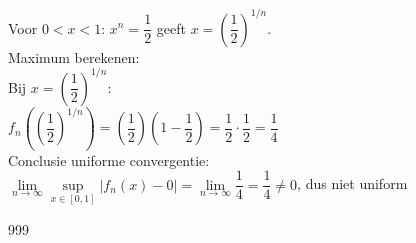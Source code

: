 \documentclass[a4paper]{article}
\begin{document}
Voor $0 < x < 1$: $x^n = \dfrac{1}{2}$ geeft $x = \left(\dfrac{1}{2}\right)^{1/n}$.\\

Maximum berekenen:\\

Bij $x = \left(\dfrac{1}{2}\right)^{1/n}$:\\

$f_n\left(\left(\dfrac{1}{2}\right)^{1/n}\right) = \left(\dfrac{1}{2}\right)\left(1-\dfrac{1}{2}\right) = \dfrac{1}{2} \cdot \dfrac{1}{2} = \dfrac{1}{4}$\\

Conclusie uniforme convergentie:\\

$\lim\limits_{n \to \infty}\sup\limits_{x \in [0,1]} |f_n(x) - 0| = \lim\limits_{n \to \infty} \dfrac{1}{4} = \dfrac{1}{4} \neq 0$, dus niet uniform\\

\begin{thebibliography}{999}
\end{thebibliography}
\end{document}
